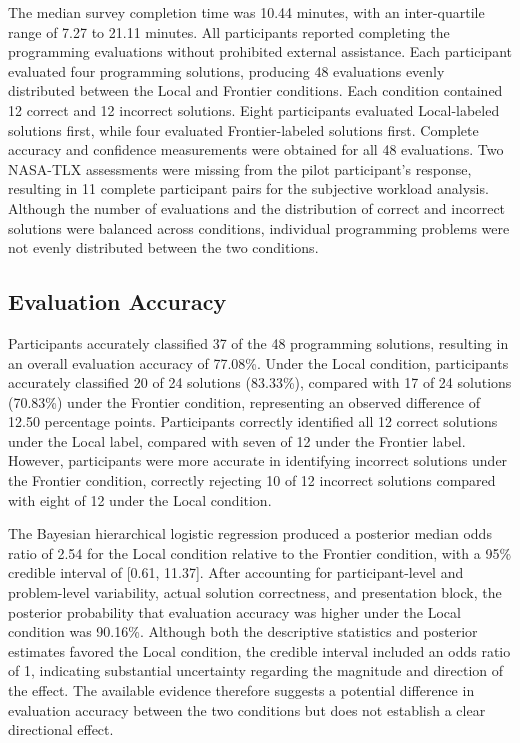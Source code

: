 \documentclass[manuscript,review]{acmart}
\begin{document}
The median survey completion time was 10.44 minutes, with an inter-quartile range of 7.27 to 21.11 minutes. All participants reported completing the programming evaluations without prohibited external assistance. Each participant evaluated four programming solutions, producing 48 evaluations evenly distributed between the Local and Frontier conditions. Each condition contained 12 correct and 12 incorrect solutions. Eight participants evaluated Local-labeled solutions first, while four evaluated Frontier-labeled solutions first. Complete accuracy and confidence measurements were obtained for all 48 evaluations. Two NASA-TLX assessments were missing from the pilot participant's response, resulting in 11 complete participant pairs for the subjective workload analysis. Although the number of evaluations and the distribution of correct and incorrect solutions were balanced across conditions, individual programming problems were not evenly distributed between the two conditions.

\subsection{Evaluation Accuracy}
Participants accurately classified 37 of the 48 programming solutions, resulting in an overall evaluation accuracy of 77.08\%. Under the Local condition, participants accurately classified 20 of 24 solutions (83.33\%), compared with 17 of 24 solutions (70.83\%) under the Frontier condition, representing an observed difference of 12.50 percentage points. Participants correctly identified all 12 correct solutions under the Local label, compared with seven of 12 under the Frontier label. However, participants were more accurate in identifying incorrect solutions under the Frontier condition, correctly rejecting 10 of 12 incorrect solutions compared with eight of 12 under the Local condition.

The Bayesian hierarchical logistic regression produced a posterior median odds ratio of 2.54 for the Local condition relative to the Frontier condition, with a 95\% credible interval of [0.61, 11.37]. After accounting for participant-level and problem-level variability, actual solution correctness, and presentation block, the posterior probability that evaluation accuracy was higher under the Local condition was 90.16\%. Although both the descriptive statistics and posterior estimates favored the Local condition, the credible interval included an odds ratio of 1, indicating substantial uncertainty regarding the magnitude and direction of the effect. The available evidence therefore suggests a potential difference in evaluation accuracy between the two conditions but does not establish a clear directional effect.
\end{document}
